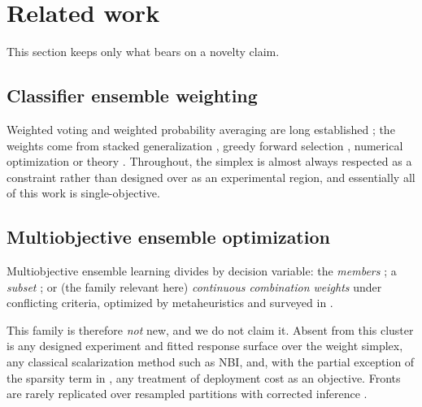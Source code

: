 \section{Related work}
\label{sec:related}

This section keeps only what bears on a novelty claim.

\subsection{Classifier ensemble weighting}
\label{sec:rel:weighting}

Weighted voting and weighted probability averaging are long established
\citep{hansen1990neural,kittler1998combining,dietterich2000ensemble,kuncheva2014combining}; the weights come from
stacked generalization
\citep{wolpert1992stacked,breiman1996stacked,leblanc1996combining,vanderlaan2007super,ledell2016auc}, greedy forward
selection \citep{caruana2004ensemble}, numerical optimization
\citep{zhang2011sparse,yao2018stacking,shahhosseini2022optimizing,hassan2026weighted,xu2026pseo} or theory
\citep{fumera2005theoretical}. Throughout, the simplex is almost always respected as a constraint rather than designed
over as an experimental region, and essentially all of this work is single-objective.

\subsection{Multiobjective ensemble optimization}
\label{sec:rel:moo}

Multiobjective ensemble learning divides by decision variable: the \emph{members}
\citep{abbass2003pareto,chandra2006ensemble,jin2008pareto}; a \emph{subset}
\citep{dossantos2008dynamic,qian2015pareto}; or (the family relevant here) \emph{continuous combination
weights} under conflicting criteria, optimized by metaheuristics
\citep{ekbal2011multiobjective,ekbal2013combining,bandyopadhyay2008amosa,onan2016multiobjective,rezaei2019multi,zhao2018multiobjective,vrugt2006multi,galvan2026simultaneous}
and surveyed in \citet{ribeiro2020ensemble}.

This family is therefore \emph{not} new, and we do not claim it. Absent from this cluster is any designed experiment
and fitted response surface over the weight simplex, any classical scalarization method such as NBI, and, with the
partial exception of the sparsity term in \citet{zhao2018multiobjective}, any treatment of deployment cost as an
objective. Fronts are rarely replicated over resampled partitions with corrected inference
\citep{demsar2006statistical}.

